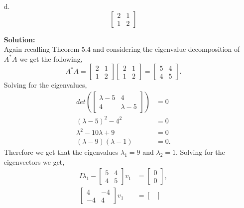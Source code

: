 \documentclass[12pt]{article}
\makeatletter
\theoremstyle{homework}
\newenvironment{exercise}[1]
{\def\@currentlabel{#1}\exercisecore}
{\endexercisecore}
\newcommand{\localhead}[1]{\par\smallskip\noindent\textbf{#1}\nobreak\\}%
\newcommand\solution{\localhead{Solution:}}
\makeatother
\begin{document}
\begin{exercise}{P10}
\begin{enumerate}
    \item[d.]   
    \begin{equation*}
      \begin{bmatrix}
        2 & 1\\
        1 & 2
      \end{bmatrix}
    \end{equation*}  
  \solution Again recalling Theorem 5.4 and considering the eigenvalue decomposition of $A^*A$ we 
  get the following, 
  \begin{equation*}
    A^*A = 
    \begin{bmatrix}
      2 & 1\\
      1 & 2
    \end{bmatrix}
    \begin{bmatrix}
      2 & 1\\
      1 & 2
    \end{bmatrix}
     = 
    \begin{bmatrix}
      5 & 4\\
      4 & 5
    \end{bmatrix}.
  \end{equation*}
  Solving for the eigenvalues, 
  \begin{align*}
    det\left(\begin{bmatrix}
      \lambda - 5 & 4\\
      4 & \lambda - 5
    \end{bmatrix}\right) &= 0\\
    (\lambda - 5)^2 - 4^2 &= 0 \\
    \lambda^2 - 10\lambda + 9 &= 0\\
    (\lambda - 9)(\lambda - 1) &= 0.
  \end{align*}
  Therefore we get that the eigenvalues $\lambda_1 = 9$ and $\lambda_2 = 1$. Solving for the 
  eigenvectors we get, 
  \begin{align*}
    I\lambda_1 - 
    \begin{bmatrix}
      5 & 4\\
      4 & 5
    \end{bmatrix}v_1 &= 
    \begin{bmatrix}
      0 \\
      0 
    \end{bmatrix},\\
    \begin{bmatrix}
      4 & -4\\
      -4 & 4
    \end{bmatrix}v_1 &= 
      \begin{bmatrix}

\end{bmatrix}
\end{align*}
\end{enumerate}
\end{exercise}
\end{document}
